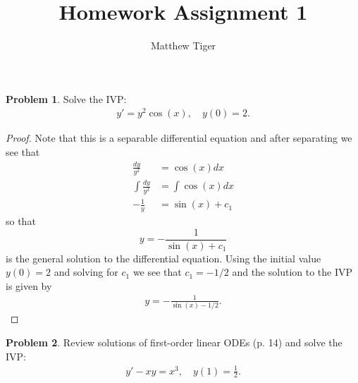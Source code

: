 \documentclass[12pt]{article}
\title{Homework Assignment 1}
\author{Matthew Tiger}
\theoremstyle{definition}
\newtheorem{problem}{Problem}
\begin{document}
\maketitle


\begin{problem}
  Solve the IVP:
  \begin{align*}
    y' = y^2\cos(x),\quad y(0)=2.
  \end{align*}
\end{problem}

\begin{proof}
  Note that this is a separable differential equation and after separating we
  see that
  \begin{align*}
    \frac{dy}{y^2} &= \cos(x)dx \\
    \int \frac{dy}{y^2} &= \int \cos(x)dx \\
    -\frac{1}{y} &= \sin(x) + c_1
  \end{align*}
  so that $$y = -\frac{1}{\sin(x) + c_1}$$ is the general solution to the differential
  equation. Using the initial value
  $y(0) = 2$ and solving for $c_1$ we see that $c_1 = -1/2$ and the solution to the IVP
  is given by
  \begin{align*}
    y = -\frac{1}{\sin(x) - 1/2}.
  \end{align*}
\end{proof}
\newpage


\begin{problem}
  Review solutions of first-order linear ODEs (p. 14) and solve the IVP:
  \begin{align*}
    y' - xy = x^3,\quad y(1) = \frac{1}{2}.
  \end{align*}
\end{problem}
\end{document}
